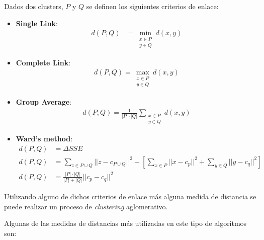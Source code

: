     Dados dos clusters, $P$ y $Q$ se definen los siguientes criterios de enlace:
    \begin{itemize}
        \item \textbf{Single Link}: 
        \begin{align*}
          d(P,Q) &= \min_{\substack{x \in P\\
                  y \in Q}}
        d(x,y) 
        \end{align*}
        \item \textbf{Complete Link}:
        \begin{align*}
          d(P,Q) = \max_{\substack{x \in P\\
                  y \in Q}}
        d(x,y) 
        \end{align*}
        \item \textbf{Group Average}:
        \begin{align*}
            d(P,Q) = \frac{1}{|P|\cdot|Q|} \sum_{\substack{x \in P\\
            y \in Q}}
            d(x,y)
        \end{align*}
        \item \textbf{Ward’s method}:
        \begin{align*}
            d(P,Q) &= \Delta SSE \\
            d(P,Q) &= \sum_{z \in P \cup Q} ||z-c_{P \cup Q}||^2- \left[\sum_{x \in P}||x-c_p||^2+\sum_{y \in Q}||y-c_q||^2\right] \\
            d(P,Q) &= \frac{|P|\cdot|Q|}{|P|+|Q|}||c_p-c_q||^2 
        \end{align*}
    \end{itemize}
    Utilizando alguno de dichos criterios de enlace más alguna medida de distancia se puede realizar un proceso de \textit{clustering} aglomerativo. 
    
    Algunas de las medidas de distancias más utilizadas en este tipo de algoritmos son:
    

